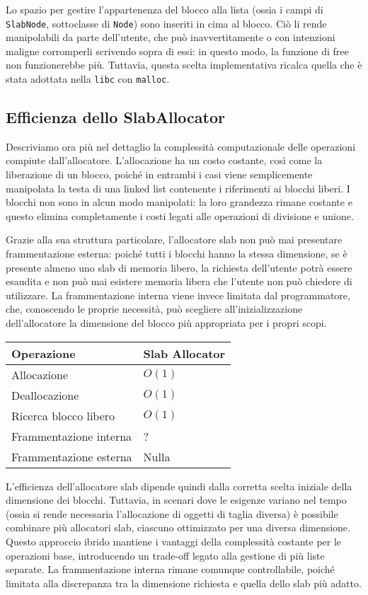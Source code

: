 Lo spazio per gestire l’appartenenza del blocco alla lista (ossia i campi di \texttt{SlabNode}, sottoclasse di \texttt{Node}) sono inseriti in cima al blocco. Ciò li rende manipolabili da parte dell’utente, che può inavvertitamente o con intenzioni maligne corromperli scrivendo sopra di essi: in questo modo, la funzione di free non funzionerebbe più. Tuttavia, questa scelta implementativa ricalca quella che è stata adottata nella \texttt{libc} con \texttt{malloc}.

\subsection{Efficienza dello SlabAllocator}

Descriviamo ora più nel dettaglio la complessità computazionale delle operazioni compiute dall’allocatore. L’allocazione ha un costo costante, così come la liberazione di un blocco, poiché in entrambi i casi viene semplicemente manipolata la testa di una linked list contenente i riferimenti ai blocchi liberi. I blocchi non sono in alcun modo manipolati: la loro grandezza rimane costante e questo elimina completamente i costi legati alle operazioni di divisione e unione.

Grazie alla sua struttura particolare, l’allocatore slab non può mai presentare frammentazione esterna: poiché tutti i blocchi hanno la stessa dimensione, se è presente almeno uno slab di memoria libero, la richiesta dell’utente potrà essere esaudita e non può mai esistere memoria libera che l’utente non può chiedere di utilizzare. La frammentazione interna viene invece limitata dal programmatore, che, conoscendo le proprie necessità, può scegliere all’inizializzazione dell’allocatore la dimensione del blocco più appropriata per i propri scopi.

\begin{table}[h]
\centering
\begin{tabular}{|l|l|}
\hline
Operazione & Slab Allocator \\
\hline
Allocazione & $O(1)$ \\
Deallocazione & $O(1)$ \\
Ricerca blocco libero & $O(1)$ \\
Frammentazione interna & ? \\
Frammentazione esterna & Nulla \\
\hline
\end{tabular}
\end{table}

L’efficienza dell’allocatore slab dipende quindi dalla corretta scelta iniziale della dimensione dei blocchi. Tuttavia, in scenari dove le esigenze variano nel tempo (ossia si rende necessaria l’allocazione di oggetti di taglia diversa) è possibile combinare più allocatori slab, ciascuno ottimizzato per una diversa dimensione. Questo approccio ibrido mantiene i vantaggi della complessità costante per le operazioni base, introducendo un trade-off legato alla gestione di più liste separate. La frammentazione interna rimane comunque controllabile, poiché limitata alla discrepanza tra la dimensione richiesta e quella dello slab più adatto.

